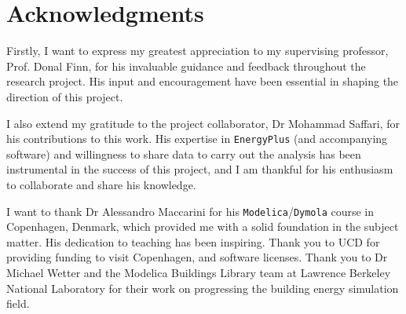 


\bigskip

\begingroup
\let\clearpage\relax
\let\cleardoublepage\relax
\let\cleardoublepage\relax
\chapter*{Acknowledgments}
Firstly, I want to express my greatest appreciation to my supervising professor, Prof. Donal Finn, for his invaluable guidance and feedback throughout the research project. His input and encouragement have been essential in shaping the direction of this project.

I also extend my gratitude to the project collaborator, Dr Mohammad Saffari, for his contributions to this work. His expertise in \texttt{EnergyPlus} (and accompanying software) and willingness to share data to carry out the analysis has been instrumental in the success of this project, and I am thankful for his enthusiasm to collaborate and share his knowledge.

I want to thank Dr Alessandro Maccarini for his \texttt{Modelica}/\texttt{Dymola} course in Copenhagen, Denmark, which provided me with a solid foundation in the subject matter. His dedication to teaching has been inspiring. Thank you to UCD for providing funding to visit Copenhagen, and software licenses. Thank you to Dr Michael Wetter and the Modelica Buildings Library team at Lawrence Berkeley National Laboratory for their work on progressing the building energy simulation field. 

